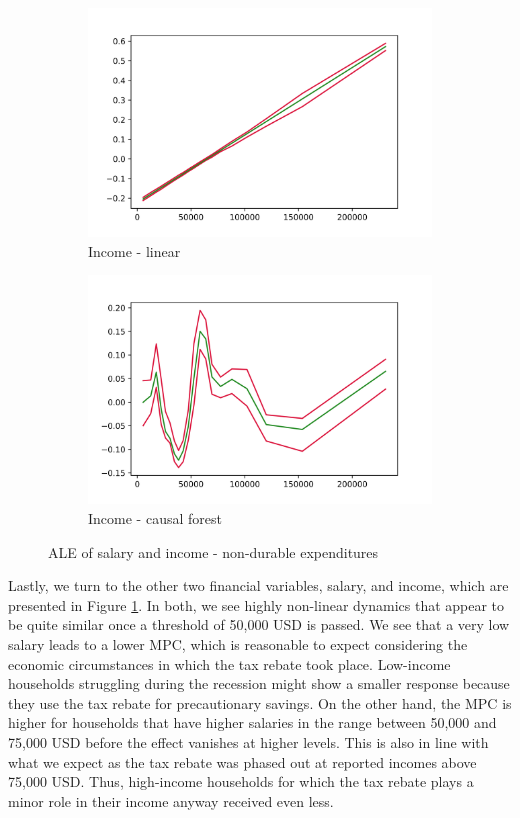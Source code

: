 \begin{figure}[t]
    \begin{subfigure}{0.5\textwidth}
        \includegraphics[width=\textwidth]{figures/ALE/chNDexp/spec3_linear_FINCBTXM.png}
        \caption{Income - linear}
    \end{subfigure}\hfill
    \begin{subfigure}{0.5\textwidth}
        \includegraphics[width=\textwidth]{figures/ALE/chNDexp/spec3_cf_FINCBTXM.png}
        \caption{Income - causal forest}
    \end{subfigure}\hfill
    \caption{ALE of salary and income - non-durable expenditures}
    \label{fig:ale_saleinc}
\end{figure}
Lastly, we turn to the other two financial variables, salary, and income, which are presented in Figure \ref{fig:ale_saleinc}. In both, we see highly non-linear dynamics that appear to be quite similar once a threshold of 50,000 USD is passed. We see that a very low salary leads to a lower MPC, which is reasonable to expect considering the economic circumstances in which the tax rebate took place. Low-income households struggling during the recession might show a smaller response because they use the tax rebate for precautionary savings. On the other hand, the MPC is higher for households that have higher salaries in the range between 50,000 and 75,000 USD before the effect vanishes at higher levels. This is also in line with what we expect as the tax rebate was phased out at reported incomes above 75,000 USD. Thus, high-income households for which the tax rebate plays a minor role in their income anyway received even less. 